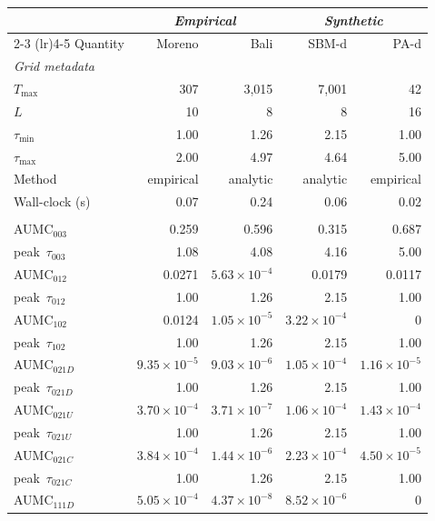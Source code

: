 \documentclass[11pt]{article}
\begin{document}
\begin{table}[!htbp]
\centering
\footnotesize
\setlength{\tabcolsep}{4pt}
\begin{tabular}{l r r | r r}
\toprule
& \multicolumn{2}{c|}{\textit{Empirical}} & \multicolumn{2}{c}{\textit{Synthetic}} \\
\cmidrule(lr){2-3} \cmidrule(lr){4-5}
Quantity & Moreno & Bali & SBM-d & PA-d \\
\midrule
\multicolumn{5}{l}{\textit{Grid metadata}} \\
$T_{\max}$    & 307 & 3{,}015 & 7{,}001 & 42 \\
$L$            & 10 & 8 & 8 & 16 \\
$\tau_{\min}$  & 1.00 & 1.26 & 2.15 & 1.00 \\
$\tau_{\max}$  & 2.00 & 4.97 & 4.64 & 5.00 \\
Method         & empirical & analytic & analytic & empirical \\
Wall-clock (s) & 0.07 & 0.24 & 0.06 & 0.02 \\
\addlinespace
\multicolumn{5}{l}{\textit{Per-class AUMC and peak~$\tau$}} \\
AUMC$_{003}$    & 0.259 & 0.596 & 0.315 & 0.687 \\
peak~$\tau_{003}$ & 1.08 & 4.08 & 4.16 & 5.00 \\
AUMC$_{012}$    & 0.0271 & $5.63\times10^{-4}$ & 0.0179 & 0.0117 \\
peak~$\tau_{012}$ & 1.00 & 1.26 & 2.15 & 1.00 \\
AUMC$_{102}$    & 0.0124 & $1.05\times10^{-5}$ & $3.22\times10^{-4}$ & 0 \\
peak~$\tau_{102}$ & 1.00 & 1.26 & 2.15 & 1.00 \\
AUMC$_{021D}$    & $9.35\times10^{-5}$ & $9.03\times10^{-6}$ & $1.05\times10^{-4}$ & $1.16\times10^{-5}$ \\
peak~$\tau_{021D}$ & 1.00 & 1.26 & 2.15 & 1.00 \\
AUMC$_{021U}$    & $3.70\times10^{-4}$ & $3.71\times10^{-7}$ & $1.06\times10^{-4}$ & $1.43\times10^{-4}$ \\
peak~$\tau_{021U}$ & 1.00 & 1.26 & 2.15 & 1.00 \\
AUMC$_{021C}$    & $3.84\times10^{-4}$ & $1.44\times10^{-6}$ & $2.23\times10^{-4}$ & $4.50\times10^{-5}$ \\
peak~$\tau_{021C}$ & 1.00 & 1.26 & 2.15 & 1.00 \\
AUMC$_{111D}$    & $5.05\times10^{-4}$ & $4.37\times10^{-8}$ & $8.52\times10^{-6}$ & 0 \\

\end{tabular}
\end{table}
\end{document}
